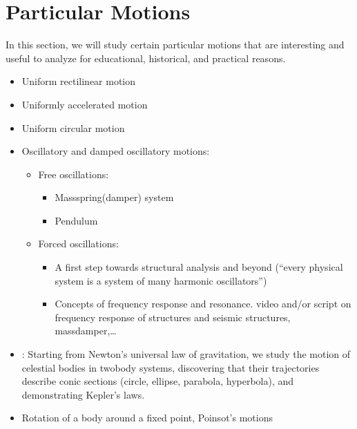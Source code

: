 \documentclass[letterpaper,10pt,english]{jupyterBook}
\begin{document}
\section{Particular Motions}
\label{\detokenize{ch/dynamics-motions:particular-motions}}\label{\detokenize{ch/dynamics-motions:classical-mechanics-dynamics-motions}}\label{\detokenize{ch/dynamics-motions::doc}}
\sphinxAtStartPar
In this section, we will study certain particular motions that are interesting and useful to analyze for educational, historical, and practical reasons.
\begin{itemize}
\item {} 
\sphinxAtStartPar
Uniform rectilinear motion

\item {} 
\sphinxAtStartPar
Uniformly accelerated motion

\item {} 
\sphinxAtStartPar
Uniform circular motion

\item {} 
\sphinxAtStartPar
Oscillatory and damped oscillatory motions:
\begin{itemize}
\item {} 
\sphinxAtStartPar
Free oscillations:
\begin{itemize}
\item {} 
\sphinxAtStartPar
Mass\sphinxhyphen{}spring(\sphinxhyphen{}damper) system

\item {} 
\sphinxAtStartPar
Pendulum

\end{itemize}

\item {} 
\sphinxAtStartPar
Forced oscillations:
\begin{itemize}
\item {} 
\sphinxAtStartPar
A first step towards structural analysis and beyond (“every physical system is a system of many harmonic oscillators”)

\item {} 
\sphinxAtStartPar
Concepts of frequency response and resonance.  video and/or script on frequency response of structures and seismic structures, mass\sphinxhyphen{}damper,…

\end{itemize}

\end{itemize}

\item {} 
\sphinxAtStartPar
{}: Starting from Newton’s universal law of gravitation, we study the motion of celestial bodies in two\sphinxhyphen{}body systems, discovering that their trajectories describe conic sections (circle, ellipse, parabola, hyperbola), and demonstrating Kepler’s laws.

\item {} 
\sphinxAtStartPar
Rotation of a body around a fixed point, Poinsot’s motions

\end{itemize}
\end{document}
